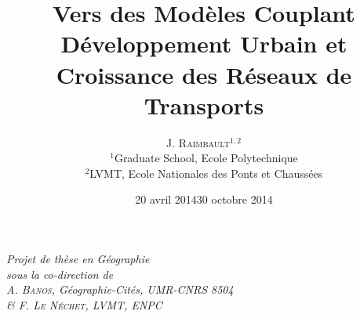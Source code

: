 \documentclass[french,12pt]{article}
\date{20 avril 2014}
\newcommand{\noun}[1]{\textsc{#1}}
\begin{document}
\title{Vers des Modèles Couplant Développement Urbain et Croissance des
Réseaux de Transports }

\date{30 octobre 2014}

\author{\noun{J. Raimbault}$^{1,2}$\\
$^{1}$Graduate School, Ecole Polytechnique \\
 $^{2}$LVMT, Ecole Nationales des Ponts et Chaussées\\
 }

\maketitle

\bigskip
\bigskip

\begin{center}
\textit{\Large { Projet de thèse en Géographie}}\\
\medskip
\textit{\Large { sous la co-direction de}}{\Large }\\
\medskip
\textit{\noun{\Large A. Banos}}\textit{\Large ,
Géographie-Cités, UMR-CNRS 8504}\\
\medskip
\textit{\Large { \& }\textit{\noun{\Large F. Le Néchet}}\textit{\Large ,
LVMT, ENPC}}
\par\end{center}{\Large \par}



\newpage
\end{document}
